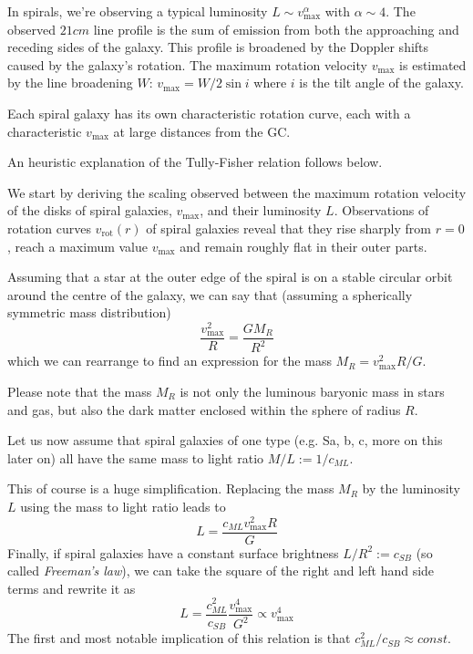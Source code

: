 In spirals, we're observing a typical luminosity $L\sim v_{\text{max}}^{\alpha}$ with $\alpha\sim 4$. The observed $21\unit{cm}$ line profile is the sum of emission from both the approaching and receding sides of the galaxy. This profile is broadened by the Doppler shifts caused by the galaxy’s rotation. The maximum rotation velocity $v_{\text{max}}$ is estimated by the line broadening $W$: $v_{\text{max}} = W/2\sin i$ where $i$ is the tilt angle of the galaxy.
\par Each spiral galaxy has its own characteristic rotation curve, each with a characteristic $v_{\text{max}}$ at large distances from the GC.
\par An heuristic explanation of the Tully-Fisher relation follows below.
\par We start by deriving the scaling observed between the maximum rotation velocity of the disks of spiral galaxies, $v_{\text{max}}$, and their luminosity $L$. Observations of rotation curves $v_{\text{rot}}(r)$ of spiral galaxies reveal that they rise sharply from $r = 0$, reach a maximum value $v_{\text{max}}$ and remain roughly flat in their outer parts.
\par Assuming that a star at the outer edge of the spiral is on a stable circular orbit around the centre of the galaxy, we can say that (assuming a spherically symmetric mass distribution)
\begin{equation*}
\frac{v_{\text{max}}^{2}}{R} = \frac{GM_{R}}{R^{2}}
\end{equation*}
which we can rearrange to find an expression for the mass $M_{R} = v_{\text{max}}^{2}R/G$.
\par Please note that the mass $M_{R}$ is not only the luminous baryonic mass in stars and gas, but also the dark matter enclosed within the sphere of radius $R$.
\par Let us now assume that spiral galaxies of one type (e.g. Sa, b, c, more on this later on) all have the same mass to light ratio $M/L:=1/c_{ML}$.
\par This of course is a huge simplification. Replacing the mass $M_{R}$ by the luminosity $L$ using the mass to light ratio leads to
\begin{equation*}
    L = \frac{c_{ML}v_{\text{max}}^{2}R}{G}
\end{equation*}
Finally, if spiral galaxies have a constant surface brightness $L/R^{2}:=c_{SB}$ (so called \emph{Freeman’s law}), we can take the square of the right and left hand side terms and rewrite it as
\begin{equation}
    L = \frac{c_{ML}^{2}}{c_{SB}}\frac{v_{\text{max}}^{4}}{G^{2}} \propto v_{\text{max}}^{4}
    \label{eq:tullyfisher}
\end{equation}
The first and most notable implication of this relation is that $c_{ML}^{2}/c_{SB}\approx\unit{const.}$

